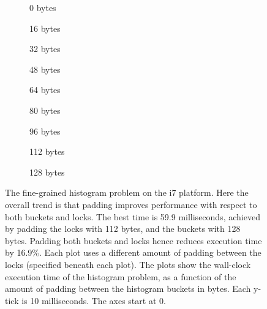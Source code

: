 \begin{figure}[hbpt]
	\graphicspath{{plots/}}
	\begin{subfigure}{0.32\textwidth}
		
		\caption{0 bytes}
	\end{subfigure}
	\begin{subfigure}{0.32\textwidth}
		
		\caption{16 bytes}
	\end{subfigure}
	\begin{subfigure}{0.32\textwidth}
		
		\caption{32 bytes}
	\end{subfigure}
	\begin{subfigure}{0.32\textwidth}
		
		\caption{48 bytes}
	\end{subfigure}
	\begin{subfigure}{0.32\textwidth}
		
		\caption{64 bytes}
	\end{subfigure}
	\begin{subfigure}{0.32\textwidth}
		
		\caption{80 bytes}
	\end{subfigure}
	\begin{subfigure}{0.33\textwidth}
		
		\caption{96 bytes}
	\end{subfigure}
	\begin{subfigure}{0.33\textwidth}
		
		\caption{112 bytes}
	\end{subfigure}
	\begin{subfigure}{0.32\textwidth}
		
		\caption{128 bytes}
	\end{subfigure}
	\caption{The fine-grained histogram problem on the i7 platform. Here the overall
	trend is that padding improves performance with respect to both buckets
	and locks. The best time is 59.9 milliseconds, achieved by padding the
	locks with 112 bytes, and the buckets with 128 bytes. Padding both
	buckets and locks hence reduces execution time by 16.9\%.
	Each plot uses a different amount of padding between the locks
	(specified beneath each plot). The plots show the wall-clock execution
	time of the histogram problem, as a function of the amount of padding
	between the histogram buckets in bytes. Each y-tick is 10 milliseconds.
	The axes start at 0.}
	\label{fig:histo-local-i7}
\end{figure}

